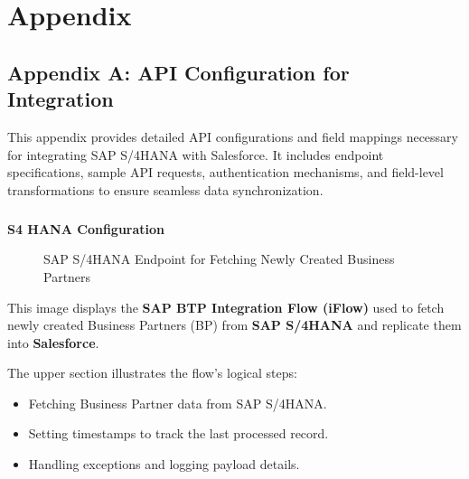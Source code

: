 
\chapter{Appendix}

\section{Appendix A: API Configuration for Integration}

This appendix provides detailed API configurations and field mappings necessary for integrating SAP S/4HANA with Salesforce. It includes endpoint specifications, sample API requests, authentication mechanisms, and field-level transformations to ensure seamless data synchronization.

\paragraph{}
\textbf{S4 HANA Configuration}

\begin{figure}[h]
    \centering
    \caption{SAP S/4HANA Endpoint for Fetching Newly Created Business Partners}
    \label{fig:s4_endpoint}
\end{figure}

\noindent This image displays the \textbf{SAP BTP Integration Flow (iFlow)} used to fetch newly created Business Partners (BP) from \textbf{SAP S/4HANA} and replicate them into \textbf{Salesforce}. 

The upper section illustrates the flow's logical steps:
\begin{itemize}
    \item Fetching Business Partner data from SAP S/4HANA.
    \item Setting timestamps to track the last processed record.
    \item Handling exceptions and logging payload details.
\end{itemize}

